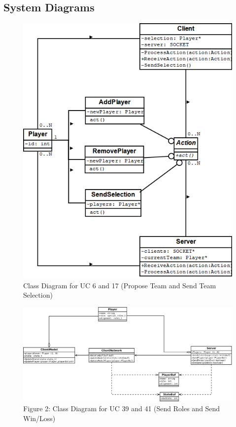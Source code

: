 \documentclass{hitec}
\begin{document}
\pagebreak

\subsection{System Diagrams}

\begin{center}
\begin{figure}[h]
\includegraphics[scale=0.5]{Report01}
\caption{Class Diagram for UC 6 and 17 (Propose Team and Send Team Selection)}
\end{figure}

\begin{figure}[h]
\includegraphics[scale=0.2]{Report02}
\caption{Figure 2: Class Diagram for UC 39 and 41 (Send Roles and Send Win/Loss)}
\end{figure}


\end{center}
\end{document}
